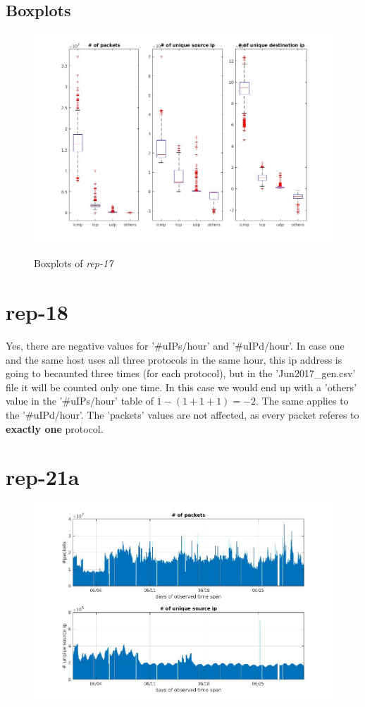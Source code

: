 \subsection*{Boxplots}
\begin{figure}[H]
\center
\includegraphics[width=.7\textwidth]{./chapters/plots/rep17.jpg}\\
\caption{Boxplots of \textit{rep-17}}
\end{figure}
\section*{rep-18}
Yes, there are negative values for '\#uIPs/hour' and '\#uIPd/hour'. In case one and the same host uses all three protocols in the same hour, this ip address is going to becaunted three times (for each protocol), but in the 'Jun2017\_gen.csv' file it will be counted only one time. In this case we would end up with a 'others' value in the '\#uIPs/hour' table of $1 - (1+1+1) = -2$. The same applies to the '\#uIPd/hour'. The 'packets' values are not affected, as every packet referes to \textbf{exactly one} protocol.

\section*{rep-21a}
\begin{figure}[H]
\center
\includegraphics[width=.7\textwidth]{./chapters/plots/rep21a.jpg}\\
\caption{}
\end{figure}

